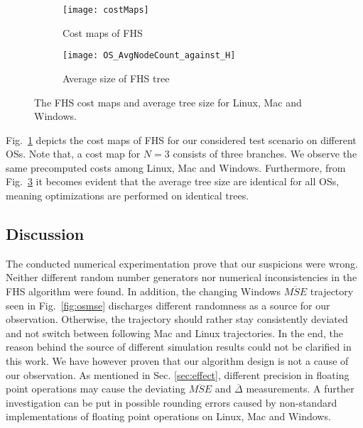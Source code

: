 \begin{figure}[htbp]
  \centering
  \begin{subfigure}[b]{0.49\textwidth}
      \centering
      \texttt{[image: costMaps]}
      \caption{Cost maps of FHS}
      \label{fig:costMaps}
  \end{subfigure}
  \hfill
  \begin{subfigure}[b]{0.49\textwidth}
      \centering
      \texttt{[image: OS\_AvgNodeCount\_against\_H]}
      \caption{Average size of FHS tree}
      \label{fig:treesize}
  \end{subfigure}
    \caption[Comparison of FHS cost maps and average tree size for different
    OS]{The FHS cost maps and average tree size for Linux, Mac and Windows.}
\end{figure}

Fig.~\ref{fig:costMaps} depicts the cost maps of FHS for our considered test
scenario on different OSs. Note that, a cost map for $N=3$ consists of three
branches. We observe the same precomputed costs among Linux, Mac and Windows.
Furthermore, from Fig.~\ref{fig:treesize} it becomes evident that the average
tree size are identical for all OSs, meaning optimizations are performed on
identical trees. 

\subsection{Discussion}

The conducted numerical experimentation prove that our suspicions were wrong.
Neither different random number generators nor numerical inconsistencies in the
FHS algorithm were found. In addition, the changing Windows $\overline{MSE}$
trajectory seen in Fig.~\ref{fig:osmse} discharges different randomness as a
source for our observation. Otherwise, the trajectory should rather stay
consistently deviated and not switch between following Mac and Linux
trajectories. In the end, the reason behind the source of different simulation
results could not be clarified in this work. We have however proven that our
algorithm design is not a cause of our observation. As mentioned in Sec.
\ref{sec:effect}, different precision in floating point operations may cause the
deviating $\overline{MSE}$ and $\overline{\Delta}$ measurements. A further
investigation can be put in possible rounding errors caused by non-standard
implementations of floating point operations on Linux, Mac and Windows.
